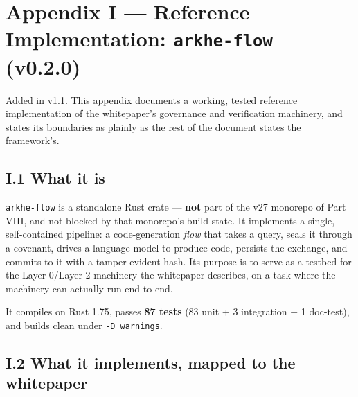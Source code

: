 \documentclass[
  11pt]{report}
\begin{document}
\hypertarget{appendix-i-reference-implementation-arkhe-flow-v0.2.0}{%
\chapter{\texorpdfstring{Appendix I --- Reference Implementation:
\texttt{arkhe-flow}
(v0.2.0)}{Appendix I --- Reference Implementation: arkhe-flow (v0.2.0)}}\label{appendix-i-reference-implementation-arkhe-flow-v0.2.0}}

Added in v1.1. This appendix documents a working, tested reference
implementation of the whitepaper's governance and verification
machinery, and states its boundaries as plainly as the rest of the
document states the framework's.

\hypertarget{i.1-what-it-is}{%
\section{I.1 What it is}\label{i.1-what-it-is}}

\texttt{arkhe-flow} is a standalone Rust crate --- \textbf{not} part of
the v27 monorepo of Part VIII, and not blocked by that monorepo's build
state. It implements a single, self-contained pipeline: a
code-generation \emph{flow} that takes a query, seals it through a
covenant, drives a language model to produce code, persists the
exchange, and commits to it with a tamper-evident hash. Its purpose is
to serve as a testbed for the Layer-0/Layer-2 machinery the whitepaper
describes, on a task where the machinery can actually run end-to-end.

It compiles on Rust 1.75, passes \textbf{87 tests} (83 unit + 3
integration + 1 doc-test), and builds clean under \texttt{-D\ warnings}.

\hypertarget{i.2-what-it-implements-mapped-to-the-whitepaper}{%
\section{I.2 What it implements, mapped to the
whitepaper}\label{i.2-what-it-implements-mapped-to-the-whitepaper}}
\end{document}
